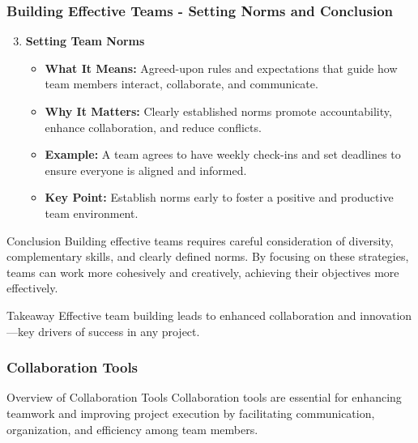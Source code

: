 \documentclass[aspectratio=169]{beamer}
\begin{document}
\begin{frame}[fragile]
    \frametitle{Building Effective Teams - Setting Norms and Conclusion}
    \begin{enumerate}
        \setcounter{enumi}{2}
        \item \textbf{Setting Team Norms}
        \begin{itemize}
            \item \textbf{What It Means:} Agreed-upon rules and expectations that guide how team members interact, collaborate, and communicate.
            \item \textbf{Why It Matters:} Clearly established norms promote accountability, enhance collaboration, and reduce conflicts.
            \item \textbf{Example:} A team agrees to have weekly check-ins and set deadlines to ensure everyone is aligned and informed.
            \item \textbf{Key Point:} Establish norms early to foster a positive and productive team environment.
        \end{itemize}
    \end{enumerate}

    \begin{block}{Conclusion}
        Building effective teams requires careful consideration of diversity, complementary skills, and clearly defined norms. By focusing on these strategies, teams can work more cohesively and creatively, achieving their objectives more effectively.
    \end{block}

    \begin{block}{Takeaway}
        Effective team building leads to enhanced collaboration and innovation—key drivers of success in any project.
    \end{block}
\end{frame}

\begin{frame}[fragile]
    \frametitle{Collaboration Tools}
    \begin{block}{Overview of Collaboration Tools}
        Collaboration tools are essential for enhancing teamwork and improving project execution by facilitating communication, organization, and efficiency among team members.
    \end{block}
\end{frame}
\end{document}
